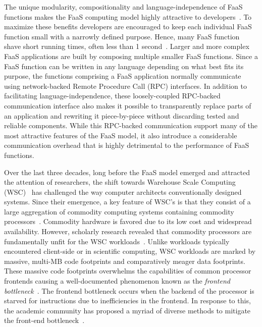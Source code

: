 \documentclass[../main.tex]{subfiles}
\begin{document}
\begin{refsection}
The unique modularity, compositionality and language-independence of
FaaS functions makes the FaaS computing model highly attractive to
developers~\cite{williams16_growin_need_micros_bioin}. To maximize
these benefits developers are encouraged to keep each individual FaaS
function small with a narrowly defined purpose. Hence, many FaaS
function shave short running times, often less than 1
second~\cite{shahrad19_archit_implic_funct_servic_comput,mahgoub22_wisef,shahrad20_server_wild,lukewarm_serverless,du20_catal}.
Larger and more complex FaaS applications are built by composing
multiple smaller FaaS functions. Since a FaaS function can be written
in any language depending on what best fits its purpose, the functions
comprising a FaaS application normally communicate using
network-backed Remote Procedure Call (RPC) interfaces. In addition to
facilitating language-independence, these loosely-coupled RPC-backed
communication interface also makes it possible to transparently
replace parts of an application and rewriting it piece-by-piece
without discarding tested and reliable components. While this
RPC-backed communication support many of the most attractive features
of the FaaS model, it also introduce a considerable communication
overhead that is highly detrimental to the performance of FaaS
functions.

Over the last three decades, long before the FaaS model emerged and
attracted the attention of researchers, the shift towards Warehouse
Scale Computing (WSC)~\cite{barroso18_datac_as_comput} has challenged
the way computer architects conventionally designed systems. Since
their emergence, a key feature of WSC's is that they consist of a
large aggregation of commodity computing systems containing commodity
processors~\cite{barroso03_web_searc_planet}. Commodity hardware is
favored due to its low cost and widespread availability. However,
scholarly research revealed that commodity processors are
fundamentally unfit for the WSC
workloads~\cite{ferdman12_clear_cloud,kanev15_profil}. Unlike
workloads typically encountered client-side or in scientific
computing, WSC workloads are marked by massive, multi-MB code
footprints and comparatively meager data footprints. These massive
code footprints overwhelms the capabilities of common processor
frontends causing a well-documented phenomenon known as the
\emph{frontend
  bottleneck}~\cite{ailamaki99_dbmss_moder_proces,keeton98_perfor_charac_quad_pentium_pro,ranganathan98_perfor_datab_workl_shared_memor}. The
frontend bottleneck occurs when the backend of the processor is
starved for instructions due to inefficiencies in the frontend. In
response to this, the academic community has proposed a myriad of
diverse methods to mitigate the front-end
bottleneck~\cite{reinman99_fetch_direc_instr_prefet,kumar17_boomer,kumar18_blast_throug_front_end_bottl_with_shotg,kumar20_shoot_down_server_front_end_bottl,ferdman08_tempor,ferdman11_proac_instr_fetch,kaynak13_shift,kaynak15_confl,ayers19_asmdb,ajorpaz18_explor_predic_replac_polic_instr,khan20_i_spy,soundararajan21_pdede,ansari20_divid,khan21_rippl,}.



\end{refsection}
\end{document}
